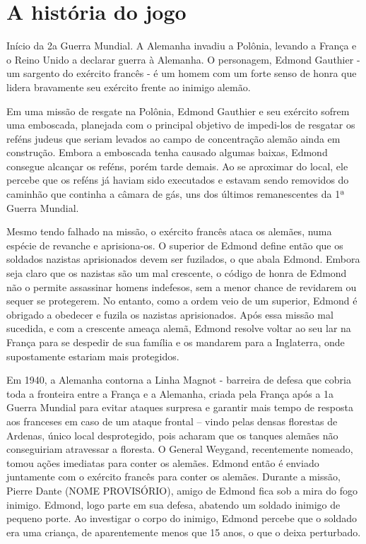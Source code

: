 \documentclass{article}
\begin{document}
\section{A história do jogo}

   Início da 2a Guerra Mundial. A Alemanha invadiu a Polônia, levando a França e o Reino Unido a declarar guerra à Alemanha. O personagem, Edmond Gauthier - um sargento do exército francês - é um homem com um forte senso de honra que lidera bravamente seu exército frente ao inimigo alemão.
   
Em uma missão de resgate na Polônia, Edmond Gauthier e seu exército sofrem uma emboscada, planejada com o principal objetivo de impedi-los de resgatar os reféns judeus que seriam levados ao campo de concentração alemão ainda em construção. Embora a emboscada tenha causado algumas baixas, Edmond consegue alcançar os reféns, porém tarde demais. Ao se aproximar do local, ele percebe que os reféns já haviam sido executados e estavam sendo removidos do caminhão que continha a câmara de gás, uns dos últimos remanescentes da 1ª Guerra Mundial.
   
    Mesmo tendo falhado na missão, o exército francês ataca os alemães, numa espécie de revanche e  aprisiona-os. O superior de Edmond define então que os soldados nazistas aprisionados devem ser fuzilados, o que abala Edmond. Embora seja claro que os nazistas são um mal crescente, o código de honra de Edmond não o permite assassinar homens indefesos, sem a menor chance de revidarem ou sequer se protegerem. No entanto, como a ordem veio de um superior, Edmond é obrigado a obedecer e fuzila os nazistas aprisionados. Após essa missão mal sucedida, e com a crescente ameaça alemã, Edmond resolve voltar ao seu lar na França para se despedir de sua família e os mandarem para a Inglaterra, onde supostamente estariam mais protegidos.
    
    Em 1940, a Alemanha contorna a Linha Magnot - barreira de defesa que cobria toda a fronteira entre a França e a Alemanha, criada pela França após a 1a Guerra Mundial para evitar ataques surpresa e garantir mais tempo de resposta aos franceses em caso de um ataque frontal – vindo pelas densas florestas de Ardenas, único local desprotegido, pois acharam que os tanques alemães não conseguiriam atravessar a floresta. O General Weygand, recentemente nomeado, tomou ações imediatas para conter os alemães. Edmond então é enviado juntamente com o exército francês para conter os alemães. Durante a missão, Pierre Dante (NOME PROVISÓRIO), amigo de Edmond fica sob a mira do fogo inimigo. Edmond, logo parte em sua defesa, abatendo um soldado inimigo de pequeno porte. Ao investigar o corpo do inimigo, Edmond percebe que o soldado era uma criança, de aparentemente menos que 15 anos, o que o deixa perturbado. 
    
\end{document}
